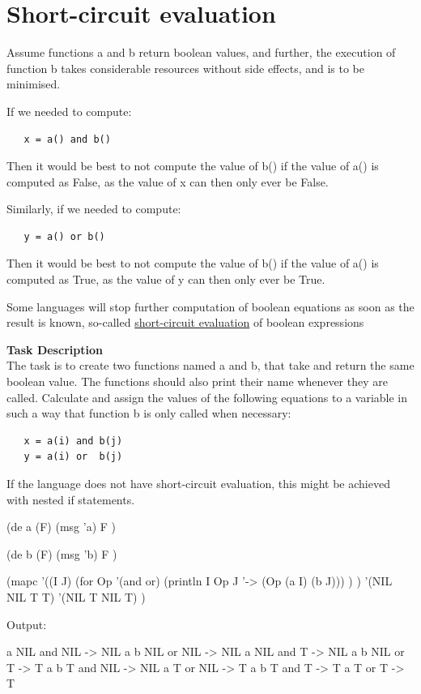 \pagebreak{}
\section*{Short-circuit evaluation}

Assume functions a and b return boolean values, and further, the
execution of function b takes considerable resources without side
effects, and is to be minimised.

If we needed to compute:

\begin{verbatim}
   x = a() and b()
\end{verbatim}

Then it would be best to not compute the value of b() if the value of
a() is computed as False, as the value of x can then only ever be False.

Similarly, if we needed to compute:

\begin{verbatim}
   y = a() or b()
\end{verbatim}

Then it would be best to not compute the value of b() if the value of
a() is computed as True, as the value of y can then only ever be True.

Some languages will stop further computation of boolean equations as
soon as the result is known, so-called
\href{http://en.wikipedia.org/wiki/Short-circuit\_evaluation}{short-circuit
evaluation} of boolean expressions

\textbf{Task Description}\\ The task is to create two functions named a
and b, that take and return the same boolean value. The functions should
also print their name whenever they are called. Calculate and assign the
values of the following equations to a variable in such a way that
function b is only called when necessary:

\begin{verbatim}
   x = a(i) and b(j)
   y = a(i) or  b(j)
\end{verbatim}

If the language does not have short-circuit evaluation, this might be
achieved with nested if statements.



\begin{wideverbatim}

(de a (F)
   (msg 'a)
   F )

(de b (F)
   (msg 'b)
   F )

(mapc
   '((I J)
      (for Op '(and or)
         (println I Op J '-> (Op (a I) (b J))) ) )
   '(NIL NIL T T)
   '(NIL T NIL T) )

Output:

a
NIL and NIL -> NIL
a
b
NIL or NIL -> NIL
a
NIL and T -> NIL
a
b
NIL or T -> T
a
b
T and NIL -> NIL
a
T or NIL -> T
a
b
T and T -> T
a
T or T -> T

\end{wideverbatim}

